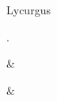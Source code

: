 \documentclass[12pt,onecolumn,twoside,a4paper]{memoir}
\begin{document}
\begin{pairs}
\begin{Rightside}
                     
                  \endnumbering
		\end{Rightside}
               \end{pairs}
	\Columns
            

         

         
            Lycurgus
            
               \textit{}
                  \textit{}.\par
               \par
            
            \begin{pairs}
               \begin{Leftside}
			\beginnumbering
			\setcounter{stanzaL}{0}
                  
                      \stanza {}
                      \&


                  
               \endnumbering
		\end{Leftside}
               \begin{Rightside}
			\beginnumbering
			\numberstanzafalse
                  
                      \stanza 
                      \&
                  
               \endnumbering
		\end{Rightside}
            \end{pairs}
	\Columns
         



      
\end{document}
